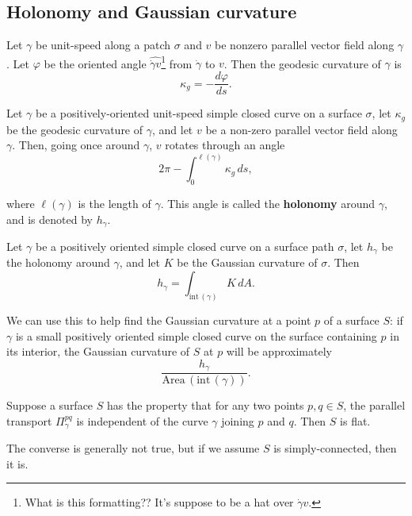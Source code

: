   \subsection{Holonomy and Gaussian curvature}
  \begin{prop}
  Let $\gamma $ be unit-speed along a patch $\sigma$ and $v$ be nonzero parallel vector field along $\gamma $. Let $\varphi $ be the oriented angle $\widehat{{ \dot { \gamma }}v} $\footnote{What is this formatting?? It's suppose to be a hat over $\dot \gamma  v$.} from $\dot \gamma $ to $v$. Then the geodesic curvature of $\gamma $ is \[
      \kappa_g= - \frac{d\varphi }{ds}.
      \] 
  \end{prop}
  \begin{prop}
      Let $\gamma $ be a positively-oriented unit-speed simple closed curve on a surface $\sigma$, let $\kappa_g$ be the geodesic curvature of $\gamma $, and let $v$ be a non-zero parallel vector field along $\gamma $. Then, going once around $\gamma $, $v$ rotates through an angle \[
          2\pi - \int_{0}^{\ell (\gamma )} \kappa_g  \, ds,
      \] 
  \end{prop}
  where $\ell(\gamma )$ is the length of $\gamma $. This angle is called the \textbf{holonomy} around $\gamma $, and is denoted by $h_{\gamma }$.
  \begin{theorem}
      Let $\gamma $ be a positively oriented simple closed curve on a surface path $\sigma$, let $h_{\gamma }$ be the holonomy around $\gamma $, and let $K$ be the Gaussian curvature of $\sigma$. Then \[
          h_{\gamma }=\int _{\text{int} \, (\gamma )}K\,dA.
      \] 
  \end{theorem}
  We can use this to help find the Gaussian curvature at a point $p$ of a surface $S$: if $\gamma $ is a small positively oriented simple closed curve on the surface containing $p$ in its interior, the Gaussian curvature of $S$ at $p$ will be approximately \[
      \frac{h_{\gamma }}{\text{Area} \,(\text{int} \,(\gamma ))}.
  \] 
  \begin{prop}
      Suppose a surface $S$ has the property that for any two points $p,q \in S$, the parallel transport $\Pi ^{pq}_{\gamma }$ is independent of the curve $\gamma $ joining $p$ and $q$. Then $S$ is flat.
  \end{prop}
  The converse is generally not true, but if we assume $S$ is simply-connected, then it is.
